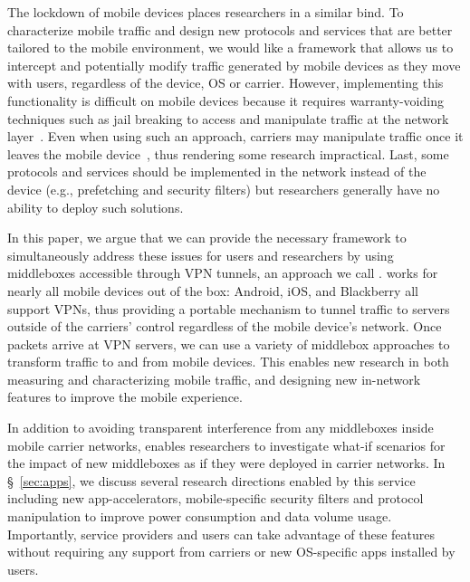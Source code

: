 The lockdown of mobile devices places researchers in a similar bind.
To characterize mobile traffic and design new protocols and
services that are better tailored to the mobile environment, we would like a
framework that allows us to intercept and potentially modify traffic
generated by mobile devices as they move with users, regardless of the
device, OS or carrier. However, implementing this functionality is
difficult on mobile devices because it requires warranty-voiding
techniques such as jail breaking to access and manipulate traffic at
the network layer~\cite{enck:taintdroid}. Even when using such an
approach, carriers may manipulate traffic once it leaves the mobile
device~\cite{wang:middleboxes}, thus rendering some research
impractical. Last, some protocols and services should be implemented
in the network instead of the device (e.g., prefetching and security
filters) but researchers generally have no ability to deploy such
solutions.


In this paper, we argue that we can provide the necessary framework to
simultaneously address these issues for users and researchers by using
middleboxes accessible through VPN tunnels, an approach we call
\meddle.  \meddle works for nearly all mobile devices out of the box:
Android, iOS, and Blackberry all support VPNs, thus providing a
portable mechanism to tunnel traffic to servers outside of the
carriers' control regardless of the mobile device's network.  Once
packets arrive at VPN servers, we can use a variety of middlebox
approaches to transform traffic to and from mobile devices. This
enables new research in both measuring and characterizing mobile
traffic, and designing new in-network features to improve the mobile
experience.

In addition to avoiding transparent interference from any  
middleboxes inside mobile carrier networks, \meddle 
enables researchers to investigate what-if scenarios for the 
impact of new middleboxes as if they were deployed in carrier 
networks. In \S~\ref{sec:apps}, we discuss several research 
directions enabled by this service including new app-accelerators, 
mobile-specific security filters and protocol manipulation 
to improve power consumption and data volume usage. Importantly, 
service providers and users can take advantage of these features 
without requiring any support from carriers or new OS-specific 
apps installed by users.


